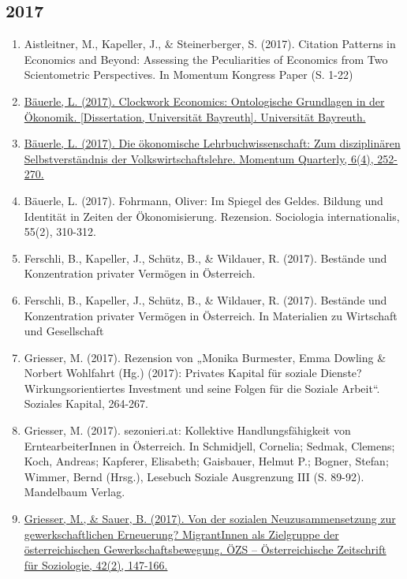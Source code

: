 \subsection*{2017}
\begin{enumerate}
	 \item Aistleitner, M., Kapeller, J., \& Steinerberger, S. (2017). Citation Patterns in Economics and Beyond: Assessing the Peculiarities of Economics from Two Scientometric Perspectives. In Momentum Kongress Paper (S. 1-22)
	 \item \href{https://epub.uni-bayreuth.de/id/eprint/3296/}{Bäuerle, L. (2017). Clockwork Economics: Ontologische Grundlagen in der Ökonomik. [Dissertation, Universität Bayreuth]. Universität Bayreuth.}
	 \item \href{https://doi.org/10.15203/momentumquarterly.vol6.no4.p252-270}{Bäuerle, L. (2017). Die ökonomische Lehrbuchwissenschaft: Zum disziplinären Selbstverständnis der Volkswirtschaftslehre. Momentum Quarterly, 6(4), 252-270.}
	 \item Bäuerle, L. (2017). Fohrmann, Oliver: Im Spiegel des Geldes. Bildung und Identität in Zeiten der Ökonomisierung. Rezension. Sociologia internationalis, 55(2), 310-312.
	 \item Ferschli, B., Kapeller, J., Schütz, B., \& Wildauer, R. (2017). Bestände und Konzentration privater Vermögen in Österreich.
	 \item Ferschli, B., Kapeller, J., Schütz, B., \& Wildauer, R. (2017). Bestände und Konzentration privater Vermögen in Österreich. In Materialien zu Wirtschaft und Gesellschaft
	 \item Griesser, M. (2017). Rezension von „Monika Burmester, Emma Dowling \& Norbert Wohlfahrt (Hg.) (2017): Privates Kapital für soziale Dienste? Wirkungsorientiertes Investment und seine Folgen für die Soziale Arbeit“. Soziales Kapital, 264-267.
	 \item Griesser, M. (2017). sezonieri.at: Kollektive Handlungsfähigkeit von ErntearbeiterInnen in Österreich. In Schmidjell, Cornelia; Sedmak, Clemens; Koch, Andreas; Kapferer, Elisabeth; Gaisbauer, Helmut P.; Bogner, Stefan; Wimmer, Bernd (Hrsg.), Lesebuch Soziale Ausgrenzung III (S. 89-92). Mandelbaum Verlag.
	 \item \href{https://doi.org/10.1007/s11614-017-0262-x}{Griesser, M., \& Sauer, B. (2017). Von der sozialen Neuzusammensetzung zur gewerkschaftlichen Erneuerung? MigrantInnen als Zielgruppe der österreichischen Gewerkschaftsbewegung. ÖZS -- Österreichische Zeitschrift für Soziologie, 42(2), 147-166.}

\end{enumerate}
